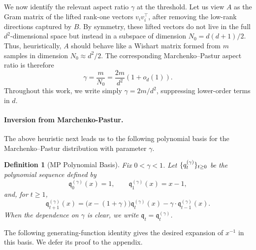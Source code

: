 \documentclass[12pt]{article}
\newtheorem{definition}[theorem]{Definition}
\newtheorem{remark}[theorem]{Remark}
\newcommand{\cm}{\mathsf{M} }
\newcommand{\q}{\mathfrak q}
\newcommand{\Authornote}[3]{{\sf\footnotesize\color{#3}{[#1: #2]}}}
\newcommand{\Authornote}[3]{}
\newcommand{\jnote}[1]{\Authornote{Jeff}{#1}{blue}}
\begin{document}
We now identify the relevant aspect ratio $\gamma$ at the threshold.
Let us view \(A\) as the Gram matrix of the lifted rank-one vectors \(v_i v_i^\top\),
after removing the low-rank directions captured by \(B\). By symmetry, these
lifted vectors do not live in the full \(d^2\)-dimensional space but instead in a subspace of dimension
\(
   N_0= d(d+1)/2
\).
Thus, heuristically, \( A\) should behave like a Wishart matrix formed from
\(m\) samples in dimension \(N_0\approx d^2/2\). The corresponding Marchenko--Pastur aspect
ratio is therefore
\[
    \gamma
    =
    \frac{m}{N_0}
    =
    \frac{2m}{d^2}(1+o_d(1)).
\]
Throughout this work, we write simply \(\gamma=2m/d^2\),
suppressing lower-order terms in \(d\).




\paragraph{Inversion from Marchenko-Pastur.}

The above heuristic next leads us to the following polynomial basis for the
Marchenko--Pastur distribution with parameter \(\gamma\).
\begin{definition}[MP Polynomial Basis] \label{def:MP-basis}
Fix \(0<\gamma<1\). Let \(\{\mathfrak \q_t^{(\gamma)}\}_{t\ge0}\) be the polynomial sequence defined by
\[
    \q_0^{(\gamma)}(x)=1,
    \qquad
   \q_1^{(\gamma)}(x)=x-1,
\]
and, for \(t\ge1\),
\[
    \q_{t+1}^{(\gamma)}(x)
    =
    \bigl(x-(1+\gamma)\bigr)\q_t^{(\gamma)}(x)
    -
    \gamma \cdot \q_{t-1}^{(\gamma)}(x).
\]
When the dependence on \(\gamma\) is clear, we write \(\q_t=\q_t^{(\gamma)}\). 
\end{definition}

The following generating-function identity gives the desired expansion of
\(x^{-1}\) in this basis. We defer its proof to the appendix.
\end{document}
